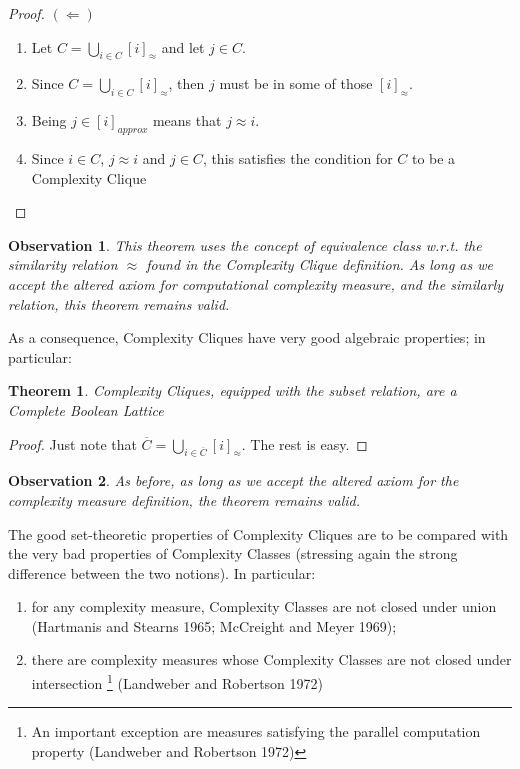 \documentclass[10pt, a4paper, oneside, titlepage, draft]{article}
\newtheorem{observation}{Observation}[shrd]
\newtheorem{theorem}[shrd]{Theorem}
\begin{document}
\begin{proof}   $(\Leftarrow)$
    \begin{enumerate}
        \item Let $C = \bigcup_{i \in C}[i]_{\approx}$ and let $j \in C$.
        \item Since $C = \bigcup_{i \in C}[i]_{\approx}$, then $j$ must be in some of those $[i]_{\approx}$.
        \item Being $j \in [i]_{approx}$ means that $j \approx i$.
        \item Since $i \in C$, $j \approx i$ and $j \in C$, this satisfies the condition for $C$ to be a Complexity Clique
    \end{enumerate}
\end{proof}

\begin{observation}
    This theorem uses the concept of equivalence class w.r.t. the similarity relation $\approx$ found in the Complexity Clique definition. As long as we accept the altered axiom for computational complexity measure, and the similarly relation, this theorem remains valid.
\end{observation}

As a consequence, Complexity Cliques have very good algebraic properties; in particular:
\begin{theorem}
    Complexity Cliques, equipped with the subset relation, are a Complete Boolean Lattice
\end{theorem}
\begin{proof}
    Just note that $\overline{C} = \bigcup_{i \in \overline{C}}[i]_{\approx}$. The rest is easy.
\end{proof}

\begin{observation}
    As before, as long as we accept the altered axiom for the complexity measure definition, the theorem remains valid.
\end{observation}

The good set-theoretic properties of Complexity Cliques are to be compared with the very bad properties of Complexity Classes (stressing again the strong difference between the two notions). In particular:
\begin{enumerate}
    \item for any complexity measure, Complexity Classes are not closed under union (Hartmanis and Stearns 1965; McCreight and Meyer 1969);
    \item there are complexity measures whose Complexity Classes are not closed under intersection \footnote{An important exception are measures satisfying the parallel computation
    property (Landweber and Robertson 1972)} (Landweber and Robertson 1972)
\end{enumerate}
\end{document}
